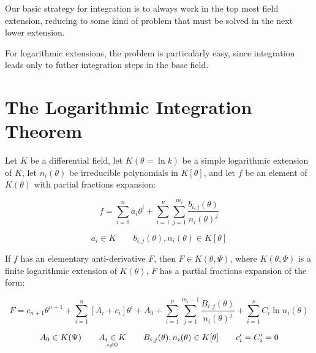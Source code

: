

Our basic strategy for integration is to always work in the top most
field extension, reducing to some kind of problem that must be
solved in the next lower extension.

For logarithmic extensions, the problem is particularly easy,
since integration leads only to futher integration steps
in the base field.

\vfill\eject
\section{The Logarithmic Integration Theorem}

\theorem\label{logarithmic integration theorem}
Let $K$ be a differential field, let $K(\theta = \ln k)$ be a simple
logarithmic extension of $K$, let $n_i(\theta)$ be
irreducible polynomials in $K[\theta]$,
and let $f$ be an element of $K(\theta)$
with partial fractions expansion:

\begin{equation}
\label{logarithmic integration theorem - integrand}
f = \sum_{i=0}^n a_i \theta^i
+ \sum_{i=1}^\nu \sum_{j=1}^{m_i} \frac{b_{i,j}(\theta)}{n_i(\theta)^j}
\end{equation}

$$a_i \in K \qquad b_{i,j}(\theta),n_i(\theta) \in K[\theta]$$

If $f$ has
an elementary anti-derivative $F$, then $F \in K(\theta, \Psi)$,
where $K(\theta, \Psi)$ is a finite logarithmic extension
of $K(\theta)$, $F$ has a partial fractions expansion of the form:


\begin{equation}
\label{logarithmic integration theorem - integral}
F = c_{n+1} \theta^{n+1} + \sum_{i=1}^{n} \left[ A_i + c_i \right] \theta^i + A_0
+ \sum_{i=1}^\nu \sum_{j=1}^{m_i-1} \frac{B_{i,j}(\theta)}{n_i(\theta)^j}
+ \sum_{i=1}^\nu C_i \ln n_i(\theta)
\end{equation}

\begin{equation*}
\arraycolsep=10pt\def\arraystretch{0}
\begin{array}{cccc}
A_0 \in K(\Psi) & A_i \in K & B_{i,j}(\theta),n_i(\theta) \in K[\theta] & c_i' = C_i' = 0 \\
& {}_{i \ne 0} & &
\end{array}
\end{equation*}


